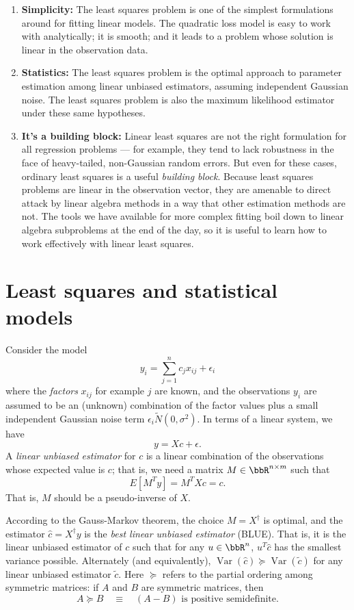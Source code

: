 \documentclass[12pt, leqno]{article} %
\begin{document}
\begin{enumerate}
  \item {\bf Simplicity:}
  The least squares problem is one of the simplest formulations
  around for fitting linear models.  The quadratic loss model
  is easy to work with analytically; it is smooth; and it leads
  to a problem whose solution is linear in the observation data.

  \item {\bf Statistics:}
  The least squares problem is the optimal approach to parameter
  estimation among linear unbiased estimators, assuming independent
  Gaussian noise.  The least squares problem is also the maximum likelihood
  estimator under these same hypotheses.

  \item {\bf It's a building block:}
  Linear least squares are not the right formulation for all regression
  problems --- for example, they tend to lack robustness in the face of
  heavy-tailed, non-Gaussian random errors.  But even for these cases,
  ordinary least squares is a useful {\em building block}.
  Because least squares problems are linear in the observation vector,
  they are amenable to direct attack by linear algebra methods in a way
  that other estimation methods are not.  The tools we
  have available for more complex fitting boil down to linear algebra
  subproblems at the end of the day, so it is useful to learn how to work
  effectively with linear least squares.
\end{enumerate}

\section{Least squares and statistical models}

Consider the model
\[
  y_i = \sum_{j=1}^n c_j x_{ij} + \epsilon_i
\]
where the {\em factors} $x_{ij}$ for example $j$ are known,
and the observations $y_i$ are assumed to be an (unknown)
combination of the factor values plus a small independent
Gaussian noise term $\epsilon_i \tilde N(0,\sigma^2)$.
In terms of a linear system, we have
\[
  y = X c + \epsilon.
\]
A {\em linear unbiased estimator} for $c$ is a linear combination
of the observations whose expected value is $c$; that is, we
need a matrix $M \in \bbR^{n \times m}$ such that
\[
  E[M^T y] = M^T X c = c.
\]
That is, $M$ should be a pseudo-inverse of $X$.

According to the Gauss-Markov theorem, the choice $M = X^\dagger$
is optimal, and the estimator $\hat{c} = X^\dagger y$
is the {\em best linear unbiased estimator} (BLUE).  That is,
it is the linear unbiased estimator of $c$ such that for any
$u \in \bbR^n$,  $u^T \hat{c}$ has the smallest variance possible.
Alternately (and equivalently),
$\operatorname{Var}(\hat{c}) \succeq \operatorname{Var}(\tilde{c})$
for any linear unbiased estimator $\tilde{c}$.  Here $\succeq$ refers
to the partial ordering among symmetric matrices: if $A$ and $B$
are symmetric matrices, then
\[
  A \succeq B \quad \equiv \quad (A-B) \mbox{ is positive semidefinite}.
\]
\end{document}
